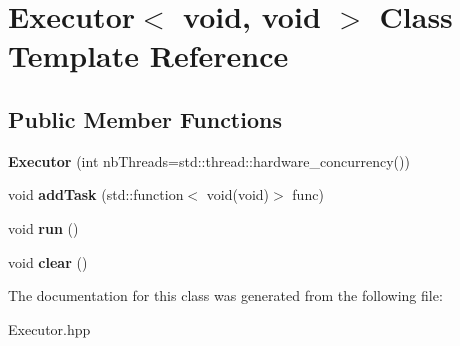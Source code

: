 \hypertarget{classExecutor_3_01void_00_01void_01_4}{}\section{Executor$<$ void, void $>$ Class Template Reference}
\label{classExecutor_3_01void_00_01void_01_4}
\subsection*{Public Member Functions}
\begin{DoxyCompactItemize}
\item 
\mbox{\label{classExecutor_3_01void_00_01void_01_4_a1f924354573e9debd3cc97ff2378bb3b}} 
{\bfseries Executor} (int nb\+Threads=std\+::thread\+::hardware\+\_\+concurrency())
\item 
\mbox{\label{classExecutor_3_01void_00_01void_01_4_afdc61e42ff31fb4a18562cf4d3d5e0b3}} 
void {\bfseries add\+Task} (std\+::function$<$ void(void)$>$ func)
\item 
\mbox{\label{classExecutor_3_01void_00_01void_01_4_aba601150cd9b408bf858f4ad15b64ed4}} 
void {\bfseries run} ()
\item 
\mbox{\label{classExecutor_3_01void_00_01void_01_4_ac1ae73ad5bdca1a0a71084bfef74e016}} 
void {\bfseries clear} ()
\end{DoxyCompactItemize}


The documentation for this class was generated from the following file\+:\begin{DoxyCompactItemize}
\item 
Executor.\+hpp\end{DoxyCompactItemize}

